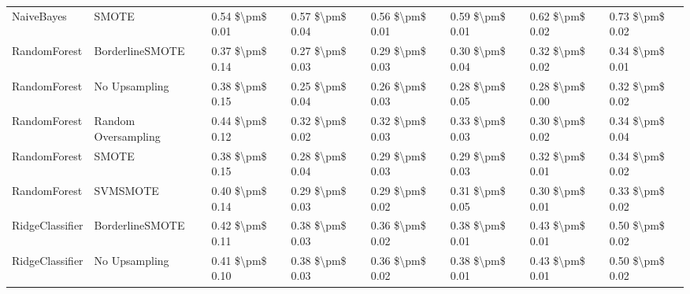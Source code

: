 \begin{tabular}{llllllll}
                     NaiveBayes &                         SMOTE & 0.54 \$\textbackslash pm\$ 0.01 &           0.57 \$\textbackslash pm\$ 0.04 &       0.56 \$\textbackslash pm\$ 0.01 &        0.59 \$\textbackslash pm\$ 0.01 &                         0.62 \$\textbackslash pm\$ 0.02 & 0.73 \$\textbackslash pm\$ 0.02 \\
                   RandomForest &               BorderlineSMOTE & 0.37 \$\textbackslash pm\$ 0.14 &           0.27 \$\textbackslash pm\$ 0.03 &       0.29 \$\textbackslash pm\$ 0.03 &        0.30 \$\textbackslash pm\$ 0.04 &                         0.32 \$\textbackslash pm\$ 0.02 & 0.34 \$\textbackslash pm\$ 0.01 \\
                   RandomForest &                 No Upsampling & 0.38 \$\textbackslash pm\$ 0.15 &           0.25 \$\textbackslash pm\$ 0.04 &       0.26 \$\textbackslash pm\$ 0.03 &        0.28 \$\textbackslash pm\$ 0.05 &                         0.28 \$\textbackslash pm\$ 0.00 & 0.32 \$\textbackslash pm\$ 0.02 \\
                   RandomForest &           Random Oversampling & 0.44 \$\textbackslash pm\$ 0.12 &           0.32 \$\textbackslash pm\$ 0.02 &       0.32 \$\textbackslash pm\$ 0.03 &        0.33 \$\textbackslash pm\$ 0.03 &                         0.30 \$\textbackslash pm\$ 0.02 & 0.34 \$\textbackslash pm\$ 0.04 \\
                   RandomForest &                         SMOTE & 0.38 \$\textbackslash pm\$ 0.15 &           0.28 \$\textbackslash pm\$ 0.04 &       0.29 \$\textbackslash pm\$ 0.03 &        0.29 \$\textbackslash pm\$ 0.03 &                         0.32 \$\textbackslash pm\$ 0.01 & 0.34 \$\textbackslash pm\$ 0.02 \\
                   RandomForest &                      SVMSMOTE & 0.40 \$\textbackslash pm\$ 0.14 &           0.29 \$\textbackslash pm\$ 0.03 &       0.29 \$\textbackslash pm\$ 0.02 &        0.31 \$\textbackslash pm\$ 0.05 &                         0.30 \$\textbackslash pm\$ 0.01 & 0.33 \$\textbackslash pm\$ 0.02 \\
                RidgeClassifier &               BorderlineSMOTE & 0.42 \$\textbackslash pm\$ 0.11 &           0.38 \$\textbackslash pm\$ 0.03 &       0.36 \$\textbackslash pm\$ 0.02 &        0.38 \$\textbackslash pm\$ 0.01 &                         0.43 \$\textbackslash pm\$ 0.01 & 0.50 \$\textbackslash pm\$ 0.02 \\
                RidgeClassifier &                 No Upsampling & 0.41 \$\textbackslash pm\$ 0.10 &           0.38 \$\textbackslash pm\$ 0.03 &       0.36 \$\textbackslash pm\$ 0.02 &        0.38 \$\textbackslash pm\$ 0.01 &                         0.43 \$\textbackslash pm\$ 0.01 & 0.50 \$\textbackslash pm\$ 0.02 \\

\end{tabular}
